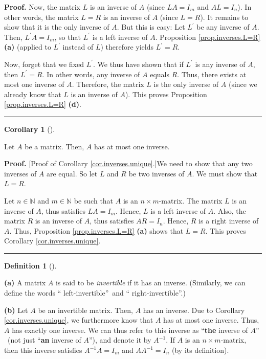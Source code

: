 \documentclass[numbers=enddot,12pt,final,onecolumn,notitlepage]{scrartcl}%
\theoremstyle{definition}
\newtheorem{defi}[theo]{Definition}
\newenvironment{definition}[1][]
{\begin{defi}[#1]\begin{leftbar}}
{\end{leftbar}\end{defi}}
\newtheorem{coro}[theo]{Corollary}
\newenvironment{corollary}[1][]
{\begin{coro}[#1]\begin{leftbar}}
{\end{leftbar}\end{coro}}
\newenvironment{proof}[1][Proof]{\noindent\textbf{#1.} }{\ \rule{0.5em}{0.5em}}
\begin{document}
\begin{proof}
Now, the matrix $L$ is an inverse of $A$ (since $LA=I_{m}$ and $AL=I_{n}$). In
other words, the matrix $L=R$ is an inverse of $A$ (since $L=R$). It remains
to show that it is the only inverse of $A$. But this is easy: Let $L^{\prime}$
be any inverse of $A$. Then, $L^{\prime}A=I_{m}$, so that $L^{\prime}$ is a
left inverse of $A$. Proposition \ref{prop.inverses.L=R} \textbf{(a)} (applied
to $L^{\prime}$ instead of $L$) therefore yields $L^{\prime}=R$.

Now, forget that we fixed $L^{\prime}$. We thus have shown that if $L^{\prime
}$ is any inverse of $A$, then $L^{\prime}=R$. In other words, any inverse of
$A$ equals $R$. Thus, there exists at most one inverse of $A$. Therefore, the
matrix $L$ is the only inverse of $A$ (since we already know that $L$ is an
inverse of $A$). This proves Proposition \ref{prop.inverses.L=R} \textbf{(d)}.
\end{proof}

\begin{corollary}
\label{cor.inverses.unique}Let $A$ be a matrix. Then, $A$ has at most one inverse.
\end{corollary}

\begin{proof}
[Proof of Corollary \ref{cor.inverses.unique}.]We need to show that any two
inverses of $A$ are equal. So let $L$ and $R$ be two inverses of $A$. We must
show that $L=R$.

Let $n\in\mathbb{N}$ and $m\in\mathbb{N}$ be such that $A$ is an $n\times
m$-matrix. The matrix $L$ is an inverse of $A$, thus satisfies $LA=I_{m}$.
Hence, $L$ is a left inverse of $A$. Also, the matrix $R$ is an inverse of
$A$, thus satisfies $AR=I_{n}$. Hence, $R$ is a right inverse of $A$. Thus,
Proposition \ref{prop.inverses.L=R} \textbf{(a)} shows that $L=R$. This proves
Corollary \ref{cor.inverses.unique}.
\end{proof}

\begin{definition}
\textbf{(a)} A matrix $A$ is said to be \textit{invertible} if it has an
inverse. (Similarly, we can define the words \textquotedblleft
left-invertible\textquotedblright\ and \textquotedblleft
right-invertible\textquotedblright.)

\textbf{(b)} Let $A$ be an invertible matrix. Then, $A$ has an inverse. Due to
Corollary \ref{cor.inverses.unique}, we furthermore know that $A$ has at most
one inverse. Thus, $A$ has exactly one inverse. We can thus refer to this
inverse as \textquotedblleft\textbf{the} inverse of $A$\textquotedblright%
\ (not just \textquotedblleft\textbf{an} inverse of $A$\textquotedblright),
and denote it by $A^{-1}$. If $A$ is an $n\times m$-matrix, then this inverse
satisfies $A^{-1}A=I_{m}$ and $AA^{-1}=I_{n}$ (by its definition).
\end{definition}
\end{document}
